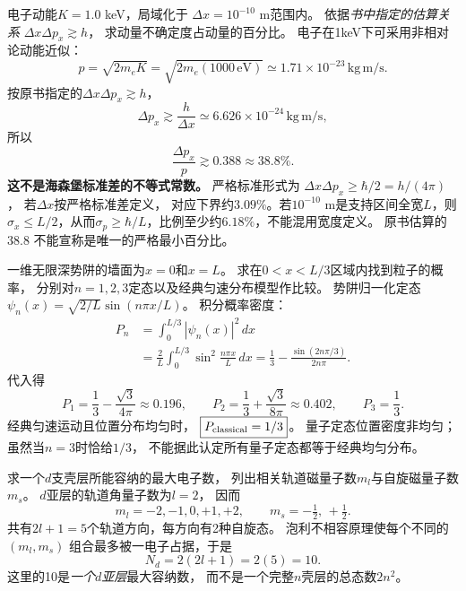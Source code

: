 \problemtext 电子动能$K=1.0$ keV，局域化于
$\Delta x=10^{-10}$ m范围内。
依据\emph{书中指定的估算关系}
$\Delta x\Delta p_x\gtrsim h$，
求动量不确定度占动量的百分比。
\workings
电子在1keV下可采用非相对论动能近似：
\[
 p=\sqrt{2m_eK}
 =\sqrt{2m_e(1000\,\mathrm{eV})}
 \simeq1.71\times10^{-23}\,\mathrm{kg\,m/s}.
\]
按原书指定的$\Delta x\Delta p_x\gtrsim h$，
\[
 \Delta p_x\gtrsim\frac h{\Delta x}
 \simeq6.626\times10^{-24}\,\mathrm{kg\,m/s},
\]
所以
\[
 \boxed{\frac{\Delta p_x}{p}\gtrsim0.388
 \approx38.8\%}.
\]
\crosscheck \textbf{这不是海森堡标准差的不等式常数。}
严格标准形式为
$\Delta x\Delta p_x\ge\hbar/2=h/(4\pi)$，
若$\Delta x$按严格标准差定义，
对应下界约$3.09\%$。若$10^{-10}$ m是支持区间全宽$L$，则$\sigma_x\le L/2$，从而$\sigma_p\ge\hbar/L$，比例至少约$6.18\%$，不能混用宽度定义。
原书估算的38.8%
不能宣称是唯一的严格最小百分比。

\problemtext 一维无限深势阱的墙面为$x=0$和$x=L$。
求在$0<x<L/3$区域内找到粒子的概率，
分别对$n=1,2,3$定态以及经典匀速分布模型作比较。
\workings
势阱归一化定态
$\psi_n(x)=\sqrt{2/L}\sin(n\pi x/L)$。
积分概率密度：
\[
 \begin{aligned}
 P_n&=\int_0^{L/3}|\psi_n(x)|^2\,dx\\
 &=\frac{2}{L}\int_0^{L/3}
       \sin^2\frac{n\pi x}{L}\,dx
 =\boxed{\frac13-\frac{\sin(2n\pi/3)}{2n\pi}}.
 \end{aligned}
\]
代入得
\[
 \boxed{P_1=\frac13-\frac{\sqrt3}{4\pi}\approx0.196},
 \qquad
 \boxed{P_2=\frac13+\frac{\sqrt3}{8\pi}\approx0.402},
 \qquad
 \boxed{P_3=\frac13}.
\]
经典匀速运动且位置分布均匀时，
$\boxed{P_{\rm classical}=1/3}$。
\crosscheck 量子定态位置密度非均匀；
虽然当$n=3$时恰给$1/3$，
不能据此认定所有量子定态都等于经典均匀分布。

\problemtext 求一个$d$支壳层所能容纳的最大电子数，
列出相关轨道磁量子数$m_l$与自旋磁量子数$m_s$。
\workings
$d$亚层的轨道角量子数为$l=2$，
因而
\[
 \boxed{m_l=-2,-1,0,+1,+2},\qquad
 \boxed{m_s=-\tfrac12,\,+\tfrac12}.
\]
共有$2l+1=5$个轨道方向，每方向有2种自旋态。
泡利不相容原理使每个不同的$(m_l,m_s)$
组合最多被一电子占据，于是
\[
 \boxed{N_d=2(2l+1)=2(5)=10}.
\]
\crosscheck 这里的10是\emph{一个$d$亚层}最大容纳数，
而不是一个完整$n$壳层的总态数$2n^2$。
